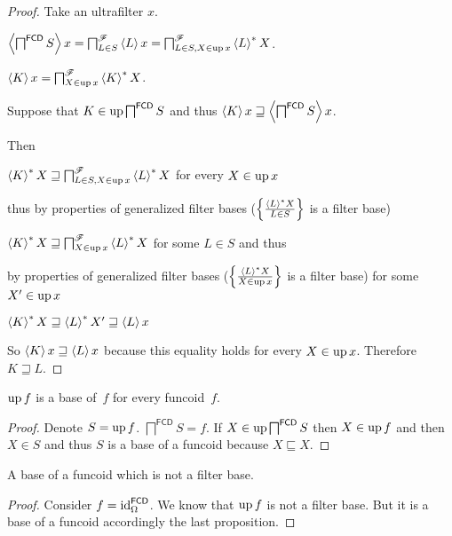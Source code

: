 \begin{proof}
  Take an ultrafilter $x$.
  
  $\left\langle \bigsqcap^{\mathsf{FCD}} S\right\rangle x =
  \bigsqcap^{\mathscr{F}}_{L \in S} \left\langle L\right\rangle x =
  \bigsqcap^{\mathscr{F}}_{L \in S, X \in \operatorname{up} x} \left\langle L\right\rangle ^{\ast} X$.
  
  $\left\langle K\right\rangle x = \bigsqcap^{\mathscr{F}}_{X \in \operatorname{up} x} \left\langle K\right\rangle ^{\ast}X$.
  
  Suppose that $K \in \operatorname{up} \bigsqcap^{\mathsf{FCD}} S$ and thus
  $\left\langle K\right\rangle x \sqsupseteq \left\langle 
  \bigsqcap^{\mathsf{FCD}} S \right\rangle x$.
  
  Then
  
  $\left\langle K\right\rangle ^{\ast} X \sqsupseteq \bigsqcap^{\mathscr{F}}_{L \in S, X
  \in \operatorname{up} x} \left\langle L\right\rangle ^{\ast} X$ for every $X \in \operatorname{up} x$
  
  thus by properties of generalized filter bases ($\left\{ \frac{ \left\langle L\right\rangle ^{\ast}X
  }{ L \in S }\right\}$ is a filter base)
  
  $\left\langle K\right\rangle ^{\ast} X \sqsupseteq \bigsqcap^{\mathscr{F}}_{X \in
  \operatorname{up} x} \left\langle L\right\rangle ^{\ast} X$ for some $L \in S$ and thus
  
  by properties of generalized filter bases ($\left\{ \frac{ \left\langle L\right\rangle ^{\ast}
  X }{ X \in \operatorname{up} x }\right\}$ is a filter base) for some $X' \in \operatorname{up} x$
  
  $\left\langle K\right\rangle ^{\ast} X \sqsupseteq \left\langle L\right\rangle ^{\ast} X'
  \sqsupseteq \left\langle L\right\rangle x$
  
  So $\left\langle K\right\rangle x \sqsupseteq \left\langle L\right\rangle x$ because this
  equality holds for every $X \in \operatorname{up} x$. Therefore $K \sqsupseteq L$.
\end{proof}

\begin{prop}
$\operatorname{up} f$ is a base of~$f$ for every funcoid~$f$.
\end{prop}

\begin{proof}
Denote $S=\operatorname{up} f$.
$\bigsqcap^{\mathsf{FCD}} S = f$.
If $X \in \operatorname{up} \bigsqcap^{\mathsf{FCD}} S$ then $X \in \operatorname{up}
f$ and then $X \in S$ and thus $S$ is a base of a funcoid because $X
\sqsubseteq X$.
\end{proof}

\begin{example}
A base of a funcoid which is not a filter base.
\end{example}

\begin{proof}
Consider $f=\operatorname{id}^{\mathsf{FCD}}_{\Omega}$. We know that $\operatorname{up} f$ is not a
filter base. But it is a base of a funcoid accordingly the last proposition.
\end{proof}

